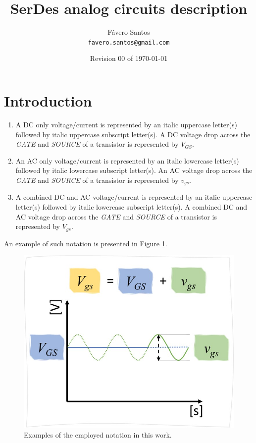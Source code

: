 \documentclass{article}
\title{SerDes analog circuits description} %
\author{Fávero Santos\\ \texttt{favero.santos@gmail.com}} %
\date{Revision 00 of \today} %
\begin{document}
\maketitle %


\section{Introduction}

\begin{info} %
	\begin{enumerate}[i]
		\item A DC only voltage/current is represented by an italic uppercase letter(s) followed by italic uppercase subscript letter(s).
		\subitem A DC voltage drop across the \textit{GATE} and \textit{SOURCE} of a transistor is represented by \textit{$V_{GS}$}.
		\item An AC only voltage/current is represented by an italic lowercase letter(s) followed by italic lowercase subscript letter(s).
		\subitem An AC voltage drop across the \textit{GATE} and \textit{SOURCE} of a transistor is represented by \textit{$v_{gs}$}.
		\item A combined DC and AC voltage/current is represented by an italic uppercase letter(s) followed by italic lowercase subscript letter(s).
		\subitem A combined DC and AC voltage drop across the \textit{GATE} and \textit{SOURCE} of a transistor is represented by \textit{$V_{gs}$}.
	\end{enumerate}
	An example of such notation is presented in Figure \ref{fig:NOTATIONR00}.
\end{info}

\begin{figure}[!b]
	\centering
	\includegraphics[scale=0.5]{./imgs/NOTATIONR00.jpg}
	\caption{Examples of the employed notation in this work.}
	\label{fig:NOTATIONR00}
\end{figure}
\end{document}
